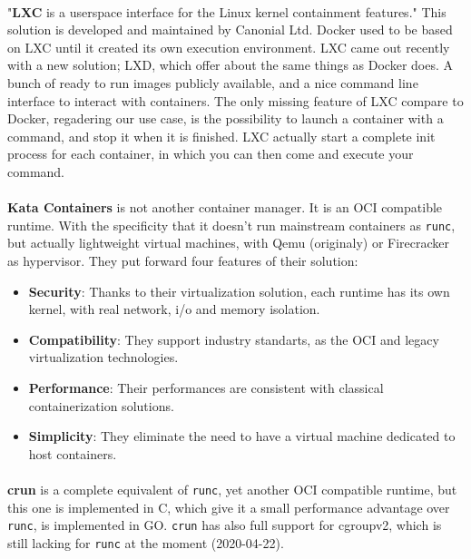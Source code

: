 \paragraph{}"\textbf{LXC} is a userspace interface for the Linux kernel containment features."\cite{lxc}  This solution is developed and maintained by Canonial Ltd.  Docker used to be based on LXC until it created its own execution environment.  LXC came out recently with a new solution; LXD, which offer about the same things as Docker does.  A bunch of ready to run images publicly available, and a nice command line interface to interact with containers.  The only missing feature of LXC compare to Docker, regadering our use case, is the possibility to launch a container with a command, and stop it when it is finished.  LXC actually start a complete init process for each container, in which you can then come and execute your command.

\paragraph{}\textbf{Kata Containers} is not another container manager.  It is an OCI compatible runtime.  With the specificity that it doesn't run mainstream containers as \texttt{runc}, but actually lightweight virtual machines, with Qemu (originaly) or Firecracker as hypervisor.
They put forward four features of their solution:
\begin{itemize}
\renewcommand\labelitemi{--}
  \item \textbf{Security}: Thanks to their virtualization solution, each runtime has its own kernel, with real network, i/o and memory isolation.
  \item \textbf{Compatibility}:  They support industry standarts, as the OCI\cite{oci} and legacy virtualization technologies.
  \item \textbf{Performance}:  Their performances are consistent with classical containerization solutions.
  \item \textbf{Simplicity}:  They eliminate the need to have a virtual machine dedicated to host containers.
\end{itemize}

\paragraph{}\textbf{crun} is a complete equivalent of \texttt{runc}, yet another OCI compatible runtime, but this one is implemented in C, which give it a small performance advantage over \texttt{runc}, is implemented in GO.  \texttt{crun} has also full support for cgroupv2, which is still lacking for \texttt{runc} at the moment (2020-04-22).

